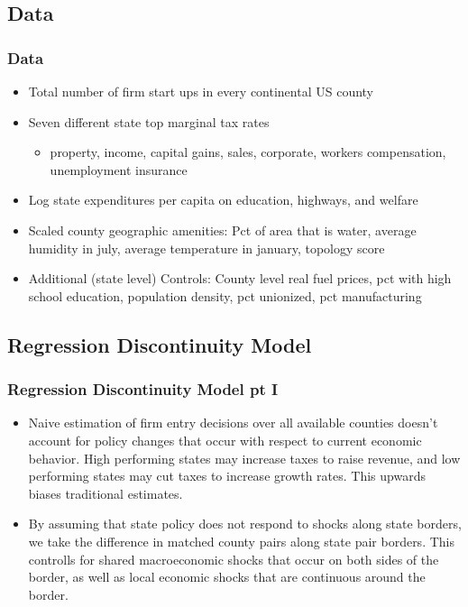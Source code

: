 \documentclass{beamer}
\begin{document}
\begin{frame}
\section{Data}
\frametitle{Data}
\begin{itemize}
\item Total number of firm start ups in every continental US county
\item Seven different state top marginal tax rates
\begin{itemize}
\item property, income, capital gains, sales, corporate, workers compensation, unemployment insurance
\end{itemize}
\item Log state expenditures per capita on education, highways, and welfare
\item Scaled county geographic amenities: Pct of area that is water, average humidity in july, average temperature in january, topology score
\item Additional (state level) Controls: County level real fuel prices, pct with high school  education, population density, pct unionized, pct manufacturing
\end{itemize}
\end{frame}

\begin{frame}
\subsection{Regression Discontinuity Model}
\frametitle{Regression Discontinuity Model pt I}
\begin{itemize}
\item Naive estimation of firm entry decisions over all available counties doesn't account for policy changes that occur with respect to current economic behavior. High performing states may increase taxes to raise revenue, and low performing states may cut taxes to increase growth rates. This upwards biases traditional estimates. 
\item By assuming that state policy does not respond to shocks along state borders, we take the difference in matched county pairs along state pair borders. This controlls for shared macroeconomic shocks that occur on both sides of the border, as well as local economic shocks that are continuous around the border.
\end{itemize}
\end{frame}
\end{document}

